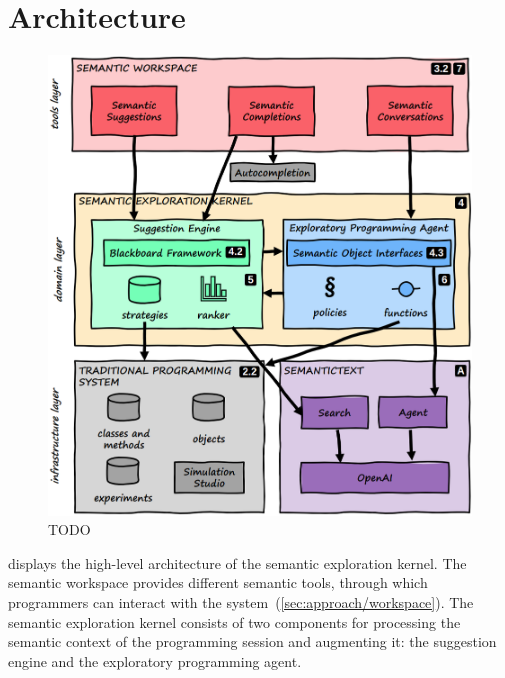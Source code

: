 
\section{Architecture}
\label{sec:design/architecture}

\begin{figure}
	\centering
	\includegraphics[width=\textwidth]{01_architecture/architecture.png}
	\caption[TODO]{
		TODO
	}
	\label{fig:design/architecture/architecture}
\end{figure}

 displays the high-level architecture of the semantic exploration kernel.
The semantic workspace provides different semantic tools, through which programmers can interact with the system~(\cref{sec:approach/workspace}).
The semantic exploration kernel consists of two components for processing the semantic context of the programming session and augmenting it: the suggestion engine and the exploratory programming agent.

